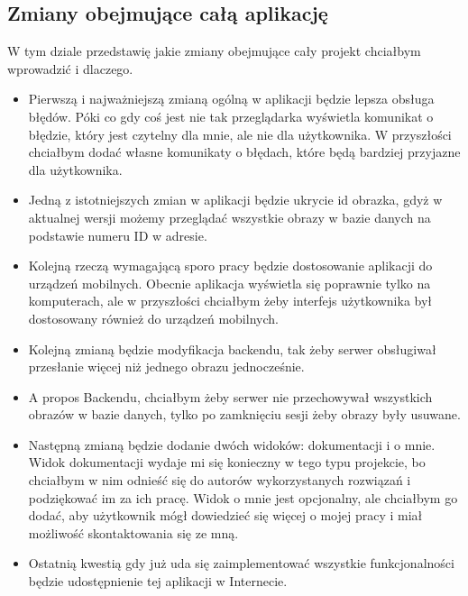 \subsection*{Zmiany obejmujące całą aplikację}

W tym dziale przedstawię jakie zmiany obejmujące cały projekt chciałbym wprowadzić i dlaczego.

\begin{itemize}
    \item Pierwszą i najważniejszą zmianą ogólną w aplikacji będzie lepsza obsługa błędów. Póki co gdy coś jest nie tak przeglądarka wyświetla komunikat o błędzie, który jest czytelny dla mnie, ale nie dla użytkownika. W przyszłości chciałbym dodać własne komunikaty o błędach, które będą bardziej przyjazne dla użytkownika.
    \item Jedną z istotniejszych zmian w aplikacji będzie ukrycie id obrazka, gdyż w aktualnej wersji możemy przeglądać wszystkie obrazy w bazie danych na podstawie numeru ID w adresie. 
    \item Kolejną rzeczą wymagającą sporo pracy będzie dostosowanie aplikacji do urządzeń mobilnych. Obecnie aplikacja wyświetla się poprawnie tylko na komputerach, ale w przyszłości chciałbym żeby interfejs użytkownika był dostosowany również do urządzeń mobilnych.
    \item Kolejną zmianą będzie modyfikacja backendu, tak żeby serwer obsługiwał przesłanie więcej niż jednego obrazu jednocześnie. 
    \item A propos Backendu, chciałbym żeby serwer nie przechowywał wszystkich obrazów w bazie danych, tylko po zamknięciu sesji żeby obrazy były usuwane.
    \item Następną zmianą będzie dodanie dwóch widoków: dokumentacji i o mnie. Widok dokumentacji wydaje mi się konieczny w tego typu projekcie, bo chciałbym w nim odnieść się do autorów wykorzystanych rozwiązań i podziękować im za ich pracę. Widok o mnie jest opcjonalny, ale chciałbym go dodać, aby użytkownik mógł dowiedzieć się więcej o mojej pracy i miał możliwość skontaktowania się ze mną.
    \item Ostatnią kwestią gdy już uda się zaimplementować wszystkie funkcjonalności będzie udostępnienie tej aplikacji w Internecie.
\end{itemize}